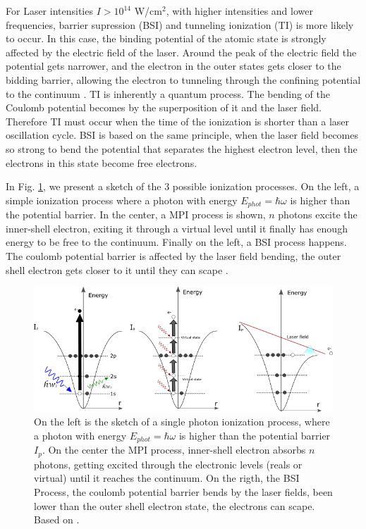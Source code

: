 For Laser intensities $I > 10^{14}$ W/cm$^{2}$,  with higher intensities and lower frequencies, barrier supression (BSI) and tunneling ionization (TI) is more likely to occur.  In this case, the binding potential of the atomic state is strongly affected by the electric field of the laser. Around the peak of the electric field the  potential gets narrower, and the electron in the outer states gets closer to the bidding barrier, allowing the electron to tunneling through the confining potential to the continuum  \cite{griffiths_introduction_2013}. TI is inherently a quantum process. The bending of the Coulomb potential becomes by the superposition of it and the laser field. Therefore TI must occur when the time of the ionization is shorter than a laser oscillation cycle\cite{berkowitz_photoabsorption_1979}. BSI is based on the same principle, when the laser field becomes so strong to bend the  potential that separates the highest electron level, then the electrons in this state become free electrons\cite{krishnan_doped_2011}.

In Fig. \ref{img:ionizationprocess}, we present a sketch of the 3 possible ionization processes. On the left, a simple ionization process where a photon with energy $E_{phot} = \hbar\omega$ is higher than the potential barrier. In the center, a MPI process is shown, $n$ photons excite the inner-shell electron, exiting it through a virtual level until it finally has enough energy to be free to the continuum. Finally on the left, a BSI process happens. The coulomb potential barrier is affected by the laser field bending, the outer shell electron gets closer to it until they can scape \cite{rafipoor_two-color_2017}.

\begin{figure}[h!]

\centering
\includegraphics[width = 14 cm]{../Images/photoionization2.png}
\caption[Ionization regimes]{ On the left is the sketch of a single photon ionization process, where a photon with energy $E_{phot} = \hbar\omega$ is higher than the potential barrier $I_{p}$. On the center the MPI process, inner-shell electron absorbs $n$ photons, getting excited through the electronic levels (reals or virtual) until it reaches the continuum. On the rigth,  the BSI Process, the coulomb potential barrier bends by the laser fields, been lower than the outer shell electron state, the electrons can scape. Based on \cite{rafipoor_two-color_2017}.}
\label{img:ionizationprocess}
\end{figure}


